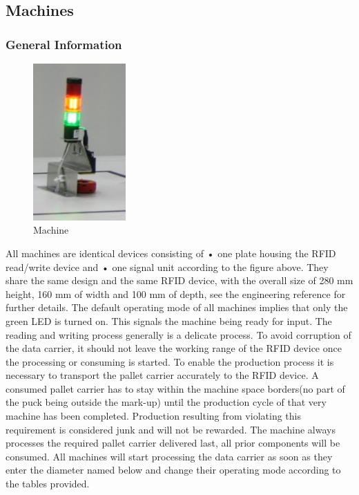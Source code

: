 \documentclass[12pt,twoside]{article}
\begin{document}
\subsection{Machines}
\subsubsection{General Information}

\begin{figure}[h]
  \centering
  \includegraphics[height=6cm]{Machine}
  \caption{Machine}
  \label{fig:machine}
\end{figure}

All machines are identical devices consisting of • one plate housing
the RFID read/write device and • one signal unit according to the
figure above. They share the same design and the same RFID device,
with the overall size of 280 mm height, 160 mm of width and 100 mm of
depth, see the engineering reference for further details. The default
operating mode of all machines implies that only the green LED is
turned on. This signals the machine being ready for input. The reading
and writing process generally is a delicate process. To avoid
corruption of the data carrier, it should not leave the working range
of the RFID device once the processing or consuming is started. To
enable the production process it is necessary to transport the pallet
carrier accurately to the RFID device. A consumed pallet carrier has
to stay within the machine space borders(no part of the puck being
outside the mark-up) until the production cycle of that very machine
has been completed. Production resulting from violating this
requirement is considered junk and will not be rewarded. The machine
always processes the required pallet carrier delivered last, all prior
components will be consumed. All machines will start processing the
data carrier as soon as they enter the diameter named below and change
their operating mode according to the tables provided.
\end{document}
